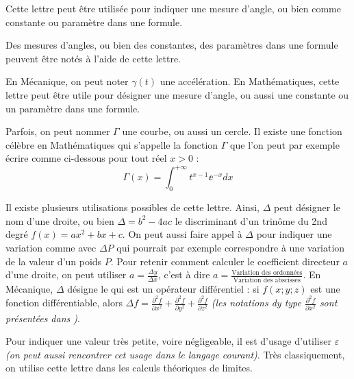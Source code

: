 
\cadre{$\alpha$} Cette lettre peut être utilisée pour indiquer une mesure d'angle, ou bien comme constante ou paramètre dans une formule.


\cadre{$\beta$} Des mesures d'angles, ou bien des constantes, des paramètres dans une formule peuvent être notés à l'aide de cette lettre.


\cadre{$\gamma$} En Mécanique, on peut noter $\gamma(t)$ une accélération. En Mathématiques, cette lettre peut être utile pour désigner une mesure d'angle, ou aussi une constante ou un paramètre dans une formule.


\cadre{$\Gamma$} Parfois, on peut nommer $\Gamma$ une courbe, ou aussi un cercle. Il existe une fonction célèbre en Mathématiques qui s'appelle la fonction $\Gamma$ que l'on peut par exemple écrire comme ci-dessous pour tout réel $x > 0$ :
\begin{equation}
    \Gamma(x) = \int_{0}^{+\infty} t^{x-1} \ee^{-x} dx
\end{equation}


\cadre{$\Delta$} Il existe plusieurs utilisations possibles de cette lettre. Ainsi, $\Delta$ peut désigner le nom d'une droite, ou bien $\Delta = b^ 2 - 4 a c$ le discriminant d’un trinôme du 2nd degré $f(x) = a x^2 + b x + c$. On peut aussi faire appel à $\Delta$ pour indiquer une variation comme avec $\Delta P$ qui pourrait par exemple correspondre à une variation de la valeur d'un poids $P$.
Pour retenir comment calculer le coefficient directeur $a$ d'une droite, on peut utiliser $a = \frac{\Delta y}{\Delta x}$, c'est à dire $a = \frac{ \text{Variation des ordonnées} }{ \text{Variation des abscisses} }$.
En Mécanique, $\Delta$ désigne le  qui est un opérateur différentiel : si $f(x;y;z)$ est une fonction différentiable, alors $\Delta f =\frac{\partial^{2} f}{\partial x^{2}} + \frac{\partial^{2} f}{\partial y^{2}} + \frac{\partial^{2} f}{\partial z^{2}}$ \emph{(les notations dy type $\frac{\partial^{2} f}{\partial x^{2}}$ sont présentées dans  \pageref{partialDer})}.


\cadre{$\varepsilon$} Pour indiquer une valeur très petite, voire négligeable, il est d'usage d'utiliser $\varepsilon$ \emph{(on peut aussi rencontrer cet usage dans le langage courant)}. Très classiquement, on utilise cette lettre dans les calculs théoriques de limites.


